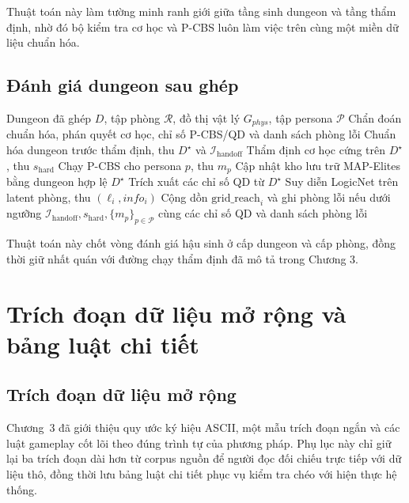 \documentclass[oneside,a4paper,12pt]{extreport}
\begin{document}
Thuật toán này làm tường minh ranh giới giữa tầng sinh dungeon và tầng thẩm định, nhờ đó bộ kiểm tra cơ học và P-CBS luôn làm việc trên cùng một miền dữ liệu chuẩn hóa.

\enlargethispage{2\baselineskip}
\subsection{Đánh giá dungeon sau ghép}
\begin{algorithm}[H]
\caption{Đánh giá dungeon sau ghép với bước chuẩn hóa, kiểm tra cơ học và P-CBS}
\label{alg:app_post_generation_evaluation}
\begin{algorithmic}[1]
\Require Dungeon đã ghép $D$, tập phòng $\mathcal{R}$, đồ thị vật lý $G_{phys}$, tập persona $\mathcal{P}$
\Ensure Chẩn đoán chuẩn hóa, phán quyết cơ học, chỉ số P-CBS/QD và danh sách phòng lỗi
\State Chuẩn hóa dungeon trước thẩm định, thu $D^\star$ và $\mathcal{I}_{\mathrm{handoff}}$
\State Thẩm định cơ học cứng trên $D^\star$, thu $s_{\mathrm{hard}}$
    \State Chạy P-CBS cho persona $p$, thu $m_p$
  \EndFor
    \State Cập nhật kho lưu trữ MAP-Elites bằng dungeon hợp lệ $D^\star$
    \State Trích xuất các chỉ số QD từ $D^\star$
  \EndIf
\EndIf
{}
    \State Suy diễn LogicNet trên latent phòng, thu $(\ell_i,info_i)$
    \State Cộng dồn $\mathrm{grid\_reach}_i$ và ghi phòng lỗi nếu dưới ngưỡng
  \EndFor
\EndIf
\State \Return $\mathcal{I}_{\mathrm{handoff}}, s_{\mathrm{hard}}, \{m_p\}_{p\in\mathcal{P}}$ cùng các chỉ số QD và danh sách phòng lỗi
\end{algorithmic}
\end{algorithm}

Thuật toán này chốt vòng đánh giá hậu sinh ở cấp dungeon và cấp phòng, đồng thời giữ nhất quán với đường chạy thẩm định đã mô tả trong Chương 3.

\FloatBarrier
\section{Trích đoạn dữ liệu mở rộng và bảng luật chi tiết}
\label{app:data_rules}

\subsection{Trích đoạn dữ liệu mở rộng}
Chương~3 đã giới thiệu quy ước ký hiệu ASCII, một mẫu trích đoạn ngắn và các luật gameplay cốt lõi theo đúng trình tự của phương pháp. Phụ lục này chỉ giữ lại ba trích đoạn dài hơn từ corpus nguồn để người đọc đối chiếu trực tiếp với dữ liệu thô, đồng thời lưu bảng luật chi tiết phục vụ kiểm tra chéo với hiện thực hệ thống.
\end{document}
